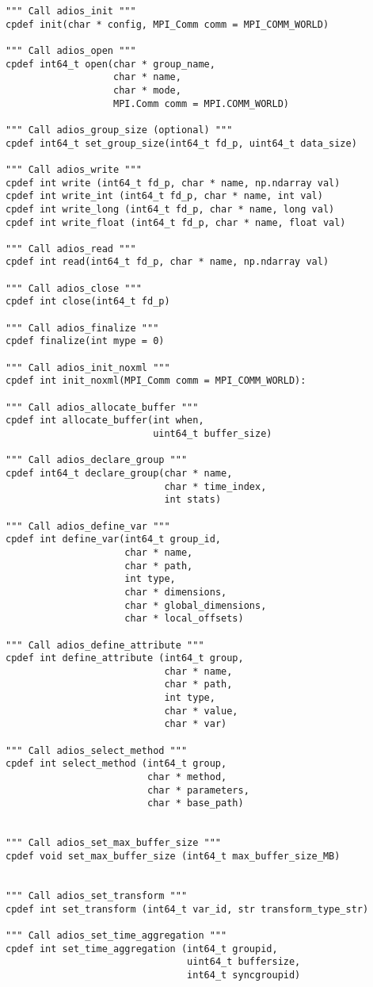 \begin{lstlisting}[language=cython,caption={Functions for writing and No-XML},label={},]
""" Call adios_init """
cpdef init(char * config, MPI_Comm comm = MPI_COMM_WORLD)

""" Call adios_open """
cpdef int64_t open(char * group_name,
                   char * name,
                   char * mode,
                   MPI.Comm comm = MPI.COMM_WORLD)

""" Call adios_group_size (optional) """
cpdef int64_t set_group_size(int64_t fd_p, uint64_t data_size)

""" Call adios_write """
cpdef int write (int64_t fd_p, char * name, np.ndarray val)
cpdef int write_int (int64_t fd_p, char * name, int val)
cpdef int write_long (int64_t fd_p, char * name, long val)
cpdef int write_float (int64_t fd_p, char * name, float val)

""" Call adios_read """
cpdef int read(int64_t fd_p, char * name, np.ndarray val)

""" Call adios_close """
cpdef int close(int64_t fd_p)

""" Call adios_finalize """
cpdef finalize(int mype = 0)

""" Call adios_init_noxml """
cpdef int init_noxml(MPI_Comm comm = MPI_COMM_WORLD):

""" Call adios_allocate_buffer """
cpdef int allocate_buffer(int when,
                          uint64_t buffer_size)

""" Call adios_declare_group """
cpdef int64_t declare_group(char * name,
                            char * time_index,
                            int stats)

""" Call adios_define_var """
cpdef int define_var(int64_t group_id,
                     char * name,
                     char * path,
                     int type,
                     char * dimensions,
                     char * global_dimensions,
                     char * local_offsets)

""" Call adios_define_attribute """
cpdef int define_attribute (int64_t group,
                            char * name,
                            char * path,
                            int type,
                            char * value,
                            char * var)

""" Call adios_select_method """
cpdef int select_method (int64_t group,
                         char * method,
                         char * parameters,
                         char * base_path)


""" Call adios_set_max_buffer_size """
cpdef void set_max_buffer_size (int64_t max_buffer_size_MB)


""" Call adios_set_transform """
cpdef int set_transform (int64_t var_id, str transform_type_str)

""" Call adios_set_time_aggregation """
cpdef int set_time_aggregation (int64_t groupid,
                                uint64_t buffersize,
                                int64_t syncgroupid)

\end{lstlisting}

